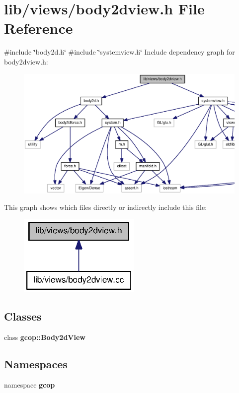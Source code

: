 \section{lib/views/body2dview.h \-File \-Reference}
\label{body2dview_8h}
{\ttfamily \#include \char`\"{}body2d.\-h\char`\"{}}\*
{\ttfamily \#include \char`\"{}systemview.\-h\char`\"{}}\*
\-Include dependency graph for body2dview.\-h\-:\nopagebreak
\begin{figure}[H]
\begin{center}
\leavevmode
\includegraphics[width=350pt]{body2dview_8h__incl}
\end{center}
\end{figure}
\-This graph shows which files directly or indirectly include this file\-:\nopagebreak
\begin{figure}[H]
\begin{center}
\leavevmode
\includegraphics[width=166pt]{body2dview_8h__dep__incl}
\end{center}
\end{figure}
\subsection*{\-Classes}
\begin{DoxyCompactItemize}
\item 
class {\bf gcop\-::\-Body2d\-View}
\end{DoxyCompactItemize}
\subsection*{\-Namespaces}
\begin{DoxyCompactItemize}
\item 
namespace {\bf gcop}
\end{DoxyCompactItemize}
